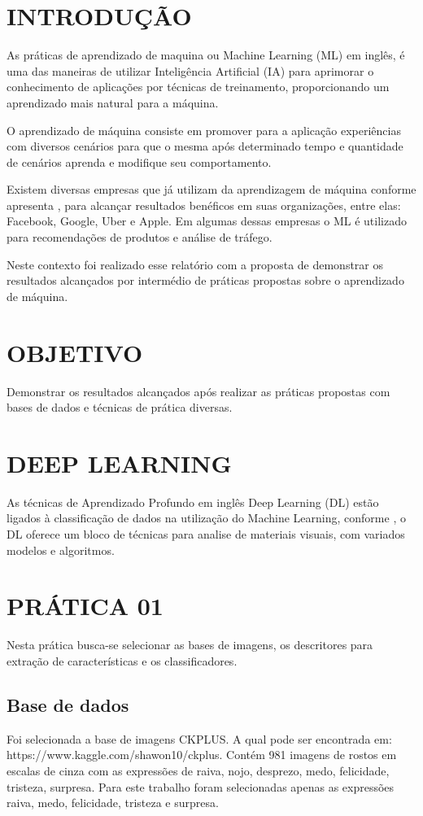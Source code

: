 \documentclass[a4paper, 12 pt, conference]{ieeeconf}  %
\begin{document}
\section{INTRODUÇÃO}
As práticas de aprendizado de maquina ou Machine Learning (ML) em inglês, é uma das maneiras de utilizar Inteligência Artificial (IA) para aprimorar o conhecimento de aplicações por técnicas de treinamento, proporcionando um aprendizado mais natural para a máquina.

O aprendizado de máquina consiste em promover para a aplicação experiências com diversos cenários para que o mesma após determinado tempo e quantidade de cenários aprenda e modifique seu comportamento.

Existem diversas empresas que já utilizam da aprendizagem de máquina conforme apresenta \cite{ray:2019}, para alcançar resultados benéficos em suas organizações, entre elas: Facebook, Google, Uber e Apple. Em algumas dessas empresas o ML é utilizado para recomendações de produtos e análise de tráfego.

Neste contexto foi realizado esse relatório com a proposta de demonstrar os resultados alcançados por intermédio de práticas propostas sobre o aprendizado de máquina.
\section{OBJETIVO}
Demonstrar os resultados alcançados após realizar as práticas propostas com bases de dados e técnicas de prática diversas.
\section{DEEP LEARNING}
As técnicas de Aprendizado Profundo em inglês Deep Learning (DL) estão ligados à classificação de dados na utilização do Machine Learning, conforme \cite{ponti:2017}, o DL oferece um bloco de técnicas para analise de materiais visuais, com variados modelos e algoritmos.

\section{PRÁTICA 01}
\label{pratica01}
Nesta prática busca-se selecionar as bases de imagens, os descritores para extração de características e os classificadores.

\subsection{Base de dados}
Foi selecionada a base de imagens CKPLUS. A qual pode ser encontrada em: https://www.kaggle.com/shawon10/ckplus. Contém 981 imagens de rostos em escalas de cinza com as expressões de raiva, nojo, desprezo, medo, felicidade, tristeza, surpresa. Para este trabalho foram selecionadas apenas as expressões raiva, medo, felicidade, tristeza e surpresa.
\end{document}
